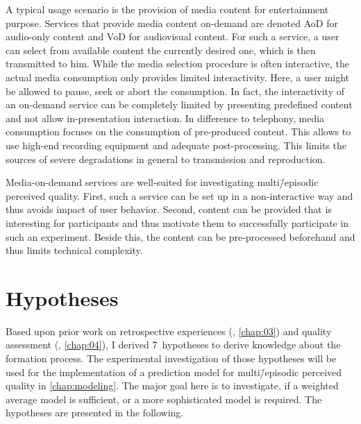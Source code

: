A typical usage scenario is the provision of media content for entertainment purpose.
Services that provide media content on-demand are denoted \acf{AoD} for audio-only content and \acf{VoD} for audiovisual content.
For such a service, a user can select from available content the currently desired one, which is then transmitted to him.
While the media selection procedure is often interactive, the actual media consumption only provides limited interactivity.
Here, a user might be allowed to pause, seek or abort the consumption.
In fact, the interactivity of an on-demand service can be completely limited by presenting predefined content and not allow in-presentation interaction.
In difference to telephony, media consumption focuses on the consumption of pre-produced content.
This allows to use high-end recording equipment and adequate post-processing. %
This limits the sources of severe degradations in general to transmission and reproduction.

Media-on-demand services are well-suited for investigating multi\=/episodic perceived quality.
First, such a service can be set up in a non-interactive way and thus avoids impact of user behavior.
Second, content can be provided that is interesting for participants and thus motivate them to successfully participate in such an experiment.
Beside this, the content can be pre-processed beforehand and thus limits technical complexity.

\section{Hypotheses}
Based upon prior work on retrospective experiences (\cf, \autoref{chap:03}) and quality assessment (\cf, \autoref{chap:04}), I derived 7~hypotheses to derive knowledge about the formation process.
The experimental investigation of those hypotheses will be used for the implementation of a prediction model for multi\=/episodic perceived quality in \autoref{chap:modeling}.
The major goal here is to investigate, if a weighted average model is sufficient, or a more sophisticated model is required.
The hypotheses are presented in the following.


